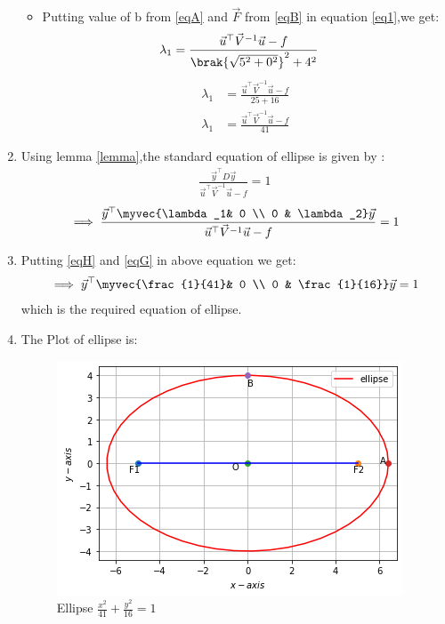 \documentclass[journal,12pt,twocolumn]{IEEEtran}
\begin{document}
\begin{enumerate}
\begin{itemize}
\item Putting value of b from \eqref{eqA} and $\vec{F}$ from \eqref{eqB} in equation \eqref{eq1},we get:
\begin{align}
   \lambda_1&= \frac{\vec{u}^{\top}\vec{V}^{-1}\vec{u}-f}{\brak{\sqrt{5^2+0^2}}^2+4^2}
    \end{align}
    \begin{align}
     \lambda_1&= \frac{\vec{u}^{\top}\vec{V}^{-1}\vec{u}-f}{25+16}
     \\
      \lambda_1&= \frac{\vec{u}^{\top}\vec{V}^{-1}\vec{u}-f}{41}\label{eqG}
\end{align}
\end{itemize}
\item Using lemma \eqref{lemma},the standard equation of ellipse is given by :
\begin{align}
\frac{\vec{y}^{\top}D\vec{y}}{\vec{u}^{\top}\vec{V}^{-1}\vec{u}-f}=1
\end{align}
\begin{align}
\implies \frac{\vec{y}^{\top}\myvec{\lambda_1& 0 \\ 0 & \lambda_2}\vec{y} }{\vec{u}^{\top}\vec{V}^{-1}\vec{u}-f}=1
\end{align}
\item Putting \eqref{eqH} and \eqref{eqG} in above equation we get:
\begin{align}
\implies \vec{y}^{\top}\myvec{\frac{1}{41}& 0 \\ 0 & \frac{1}{16}}\vec{y}=1
\end{align}
which is the required equation of ellipse.
\item The Plot of ellipse is:
\begin{figure}[!ht]
    \centering
    \includegraphics[width=\columnwidth]{Ellipse.png}
    \caption{Ellipse $\frac{x^2}{41} + \frac{y^2}{16} = 1$}
    \label{fig:ellipse}
\end{figure} 
\end{enumerate}
\end{document}
